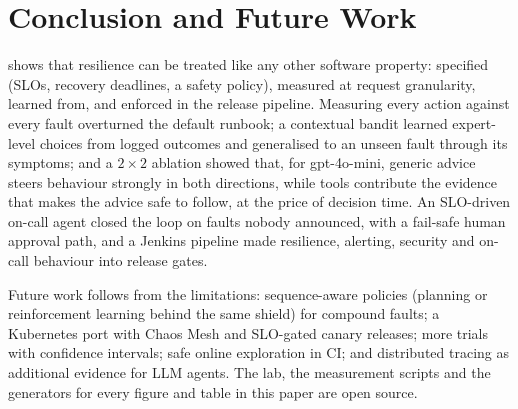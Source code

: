 \section{Conclusion and Future Work}
\sys{} shows that resilience can be treated like any other software property: specified (SLOs,
recovery deadlines, a safety policy), measured at request granularity, learned from, and enforced in
the release pipeline. Measuring every action against every fault overturned the default runbook; a
contextual bandit learned expert-level choices from logged outcomes and generalised to an unseen
fault through its symptoms; and a $2\times2$ ablation showed that, for gpt-4o-mini, generic advice
steers behaviour strongly in both directions, while tools contribute the evidence that makes the
advice safe to follow, at the price of decision time. An SLO-driven on-call agent closed the loop on
faults nobody announced, with a fail-safe human approval path, and a Jenkins pipeline made
resilience, alerting, security and on-call behaviour into release gates.

Future work follows from the limitations: sequence-aware policies (planning or reinforcement
learning behind the same shield) for compound faults; a Kubernetes port with Chaos Mesh and
SLO-gated canary releases; more trials with confidence intervals; safe online exploration in CI; and
distributed tracing as additional evidence for LLM agents. The lab, the measurement scripts and the
generators for every figure and table in this paper are open source.
